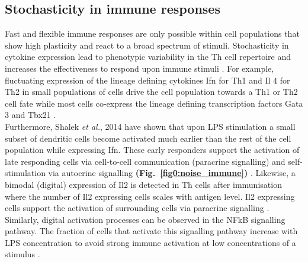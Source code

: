 
\subsection{Stochasticity in immune responses}

Fast and flexible immune responses are only possible within cell populations that show high plasticity and react to a broad spectrum of stimuli. 
Stochasticity in cytokine expression  lead to phenotypic variability in the \Gls{Th} cell repertoire and increases the effectiveness to respond upon immune stimuli \citep{Schrom2017}. 
For example, fluctuating expression of the lineage defining cytokines \gls{Ifn}\textgamma{} for Th1 and \gls{Il} 4 for Th2 in small populations of cells drive the cell population towards a Th1 or Th2 cell fate while most cells co-express the lineage defining transcription factors \Gls{Gata} 3 and \Gls{Tbx21} \citep{Fang2013a, Antebi2013}.\\

Furthermore, Shalek \textit{et al.}, 2014 have shown that upon \gls{LPS} stimulation a small subset of dendritic cells become activated much earlier than the rest of the cell population while expressing \gls{Ifn}\textbeta. 
These early responders support the activation of late responding cells via cell-to-cell communication (paracrine signalling) and self-stimulation via autocrine signalling \textbf{(Fig.~\ref{fig0:noise_immune})} \citep{Shalek2014}. 
Likewise, a bimodal (digital) expression of Il2 is detected in \gls{Th} cells after immunisation where the number of Il2 expressing cells scales with antigen level. 
Il2 expressing cells support the activation of surrounding cells via paracrine signalling \citep{Fuhrmann2016}. 
Similarly, digital activation processes can be observed in the \gls{NFkB} signalling pathway. 
The fraction of cells that activate this signalling pathway increase with LPS concentration to avoid strong immune activation at low concentrations of a stimulus \citep{Kellogg2015b}. \\

